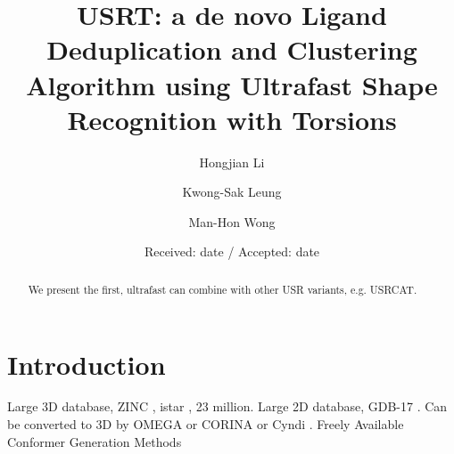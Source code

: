 \documentclass[twocolumn]{svjour3}          %
\begin{document}
\title{USRT: a de novo Ligand Deduplication and Clustering Algorithm using Ultrafast Shape Recognition with Torsions
}


\author{Hongjian Li \and Kwong-Sak Leung \and Man-Hon Wong}



\date{Received: date / Accepted: date}

\maketitle

\begin{abstract}

We present the first,
ultrafast
can combine with other USR variants, e.g. USRCAT.

\end{abstract}

\section{Introduction}

Large 3D database, ZINC \cite{532,1178}, istar \cite{1362}, 23 million.
Large 2D database, GDB-17 \cite{1276}. Can be converted to 3D by OMEGA \cite{462} or CORINA \cite{1392} or Cyndi \cite{1393,1394}. Freely Available Conformer Generation Methods \cite{1127}
\end{document}
